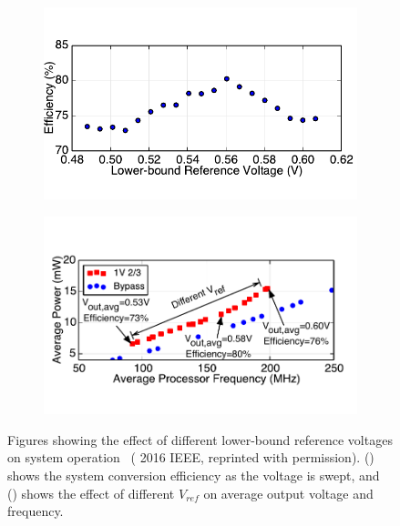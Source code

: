 \documentclass[graybox]{svmult}
\begin{document}
\begin{figure}
  \centering
  \hspace*{\fill}
  \begin{subfigure}[t]{0.45\textwidth}
  \centering
  \includegraphics[width=\textwidth]{6-raven3-dcdc-ref-a}
  \caption{}
  \label{fig:6-raven3-dcdc-ref-a}
  \end{subfigure}
  \hspace*{\fill}
  \begin{subfigure}[t]{0.45\textwidth}
  \centering
  \includegraphics[width=\textwidth]{6-raven3-dcdc-ref-b}
  \caption{}
  \label{fig:6-raven3-dcdc-ref-b}
  \end{subfigure}
  \hspace*{\fill}
  \caption{Figures showing the effect of different lower-bound reference voltages on system operation~\cite{Zimmer2016} ({\textcopyright} 2016 IEEE, reprinted with permission).  () shows the system conversion efficiency as the voltage is swept, and () shows the effect of different $V_{ref}$ on average output voltage and frequency.}
  \label{fig:6-raven3-dcdc-ref}
\end{figure}
\end{document}
